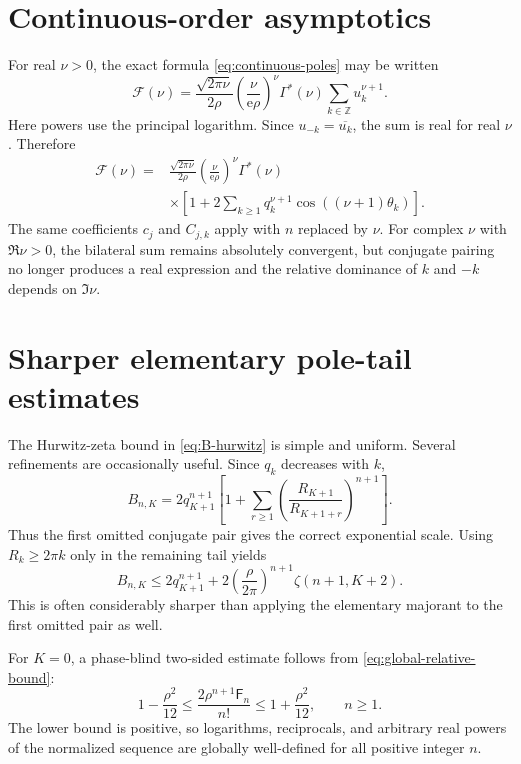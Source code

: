 \documentclass[11pt,a4paper,oneside]{article}
\theoremstyle{definition}
\theoremstyle{remark}
\newcommand{\Fub}{\mathsf{F}}
\newcommand{\e}{\mathrm{e}}
\newcommand{\GammaStar}{\Gamma^{\!*}}
\begin{document}
\section{Continuous-order asymptotics}\label{app:continuous}
For real $\nu>0$, the exact formula \cref{eq:continuous-poles} may be written
\begin{equation}\label{eq:continuous-factorization}
 \mathscr F(\nu)
 =\frac{\sqrt{2\pi\nu}}{2\rho}
  \left(\frac{\nu}{\e\rho}\right)^\nu
  \GammaStar(\nu)
  \sum_{k\in\mathbb Z}u_k^{\nu+1}.
\end{equation}
Here powers use the principal logarithm.  Since $u_{-k}=\overline{u_k}$, the
sum is real for real $\nu$.  Therefore
\begin{align}
 \mathscr F(\nu)
 ={}&\frac{\sqrt{2\pi\nu}}{2\rho}
  \left(\frac{\nu}{\e\rho}\right)^\nu
  \GammaStar(\nu)\nonumber\\
 &\times\left[1+2\sum_{k\ge1}
  q_k^{\nu+1}\cos((\nu+1)\theta_k)\right].
 \label{eq:continuous-real}
\end{align}
The same coefficients $c_j$ and $C_{j,k}$ apply with $n$ replaced by $\nu$.
For complex $\nu$ with $\Re\nu>0$, the bilateral sum remains absolutely
convergent, but conjugate pairing no longer produces a real expression and
the relative dominance of $k$ and $-k$ depends on $\Im\nu$.

\section{Sharper elementary pole-tail estimates}\label{app:tail}
The Hurwitz-zeta bound in \cref{eq:B-hurwitz} is simple and uniform.  Several
refinements are occasionally useful.  Since $q_k$ decreases with $k$,
\begin{equation}\label{eq:tail-first-plus}
 B_{n,K}=2q_{K+1}^{n+1}
 \left[1+\sum_{r\ge1}
  \left(\frac{R_{K+1}}{R_{K+1+r}}\right)^{n+1}\right].
\end{equation}
Thus the first omitted conjugate pair gives the correct exponential scale.
Using $R_k\ge2\pi k$ only in the remaining tail yields
\begin{equation}\label{eq:tail-hybrid}
 B_{n,K}
 \le2q_{K+1}^{n+1}
 +2\left(\frac{\rho}{2\pi}\right)^{n+1}
   \zeta(n+1,K+2).
\end{equation}
This is often considerably sharper than applying the elementary majorant to
the first omitted pair as well.

For $K=0$, a phase-blind two-sided estimate follows from
\cref{eq:global-relative-bound}:
\begin{equation}\label{eq:two-sided-leading}
 1-\frac{\rho^2}{12}
 \le\frac{2\rho^{n+1}\Fub_n}{n!}
 \le1+\frac{\rho^2}{12},
 \qquad n\ge1.
\end{equation}
The lower bound is positive, so logarithms, reciprocals, and arbitrary real
powers of the normalized sequence are globally well-defined for all positive
integer $n$.
\end{document}
